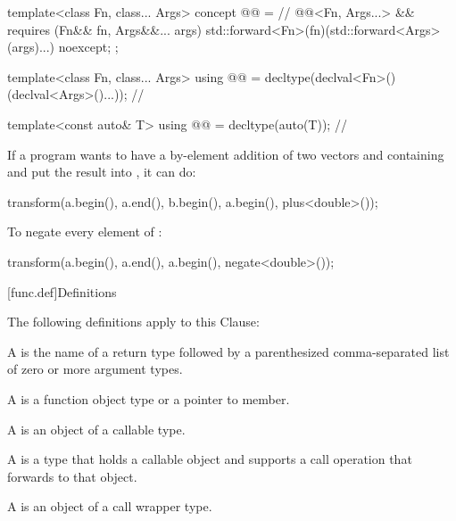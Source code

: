 \begin{codeblock}
{  template<class Fn, class... Args>
    concept @@ =                                          // \expos
      @@<Fn, Args...> &&
      requires (Fn&& fn, Args&&... args) {
        { std::forward<Fn>(fn)(std::forward<Args>(args)...) } noexcept;
      };

  template<class Fn, class... Args>
    using @@ = decltype(declval<Fn>()(declval<Args>()...));  // \expos

  template<const auto& T>
    using @@ = decltype(auto(T));                           // \expos
}
\end{codeblock}

\pnum
\begin{example}
If a \Cpp{} program wants to have a by-element addition of two vectors 
and  containing  and put the result into ,
it can do:

\begin{codeblock}
transform(a.begin(), a.end(), b.begin(), a.begin(), plus<double>());
\end{codeblock}
\end{example}

\pnum
\begin{example}
To negate every element of :

\begin{codeblock}
transform(a.begin(), a.end(), a.begin(), negate<double>());
\end{codeblock}

\end{example}

[func.def]{Definitions}

\pnum
The following definitions apply to this Clause:

\pnum
A  is the name of a return type followed by a
parenthesized comma-separated list of zero or more argument types.

\pnum
A  is a function object type or a pointer to member.

\pnum
A  is an object of a callable type.

\pnum
A  is a type that holds a callable object
and supports a call operation that forwards to that object.

\pnum
A  is an object of a call wrapper type.

